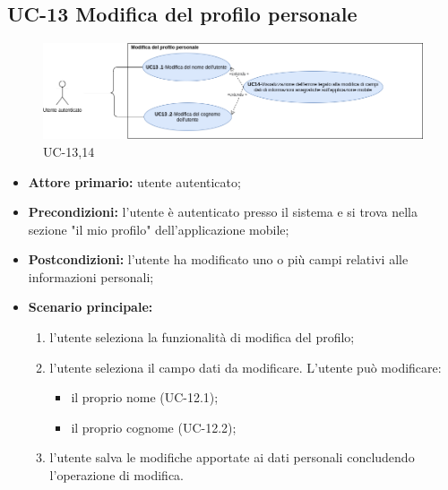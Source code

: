 \subsection{UC-13 Modifica del profilo personale} 

\begin{figure}[H]
	\centering
	\includegraphics[width=\textwidth]{src/CasiDUso/immagini/SottocasiModificaProfilo.png}
	\caption{UC-13,14}
\end{figure}

\begin{itemize}

	\item \textbf{Attore primario:} utente autenticato;

	\item \textbf{Precondizioni:} l'utente è autenticato presso il sistema e si trova nella sezione "il mio profilo" dell'applicazione mobile;

	\item \textbf{Postcondizioni:} l'utente ha modificato uno o più campi relativi alle informazioni personali;

	\item \textbf{Scenario principale:} 
	
		\begin{enumerate}
    		\item  l'utente seleziona la funzionalità di modifica del profilo;
    		\item  l'utente seleziona il campo dati da modificare. L'utente può modificare:
    		
    			\begin{itemize}
        			\item il proprio nome (UC-12.1); 
        			\item il proprio cognome (UC-12.2); 
    			\end{itemize} 
    			
    		\item l'utente salva le modifiche apportate ai dati personali concludendo l'operazione di modifica.
    		
		\end{enumerate}
		
\end{itemize}


